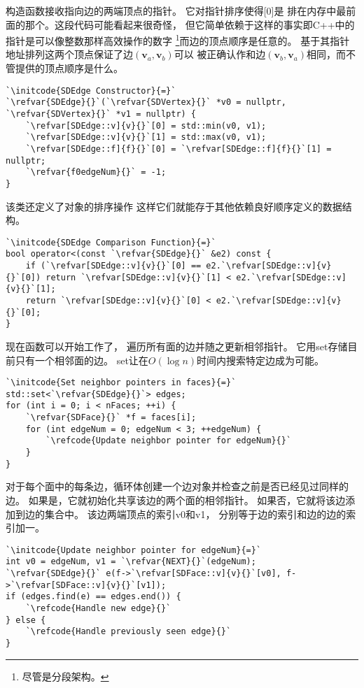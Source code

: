 构造函数接收指向边的两端顶点的指针。
它对指针排序使得{\ttfamily{}[0]}是
排在内存中最前面的那个。这段代码可能看起来很奇怪，
但它简单依赖于这样的事实即C++中的指针是可以像整数那样高效操作的数字
\footnote{尽管是分段架构。}而边的顶点顺序是任意的。
基于其指针地址排列这两个顶点保证了边$(\bm v_a,\bm v_b)$可以
被正确认作和边$(\bm v_b,\bm v_a)$相同，而不管提供的顶点顺序是什么。
\begin{lstlisting}
`\initcode{SDEdge Constructor}{=}`
`\refvar{SDEdge}{}`(`\refvar{SDVertex}{}` *v0 = nullptr, `\refvar{SDVertex}{}` *v1 = nullptr) {
    `\refvar[SDEdge::v]{v}{}`[0] = std::min(v0, v1);
    `\refvar[SDEdge::v]{v}{}`[1] = std::max(v0, v1);
    `\refvar[SDEdge::f]{f}{}`[0] = `\refvar[SDEdge::f]{f}{}`[1] = nullptr;
    `\refvar{f0edgeNum}{}` = -1;
}
\end{lstlisting}

该类还定义了对象的排序操作
这样它们就能存于其他依赖良好顺序定义的数据结构。
\begin{lstlisting}
`\initcode{SDEdge Comparison Function}{=}`
bool operator<(const `\refvar{SDEdge}{}` &e2) const {
    if (`\refvar[SDEdge::v]{v}{}`[0] == e2.`\refvar[SDEdge::v]{v}{}`[0]) return `\refvar[SDEdge::v]{v}{}`[1] < e2.`\refvar[SDEdge::v]{v}{}`[1];
    return `\refvar[SDEdge::v]{v}{}`[0] < e2.`\refvar[SDEdge::v]{v}{}`[0];
}
\end{lstlisting}

现在函数可以开始工作了，
遍历所有面的边并随之更新相邻指针。
它用{\ttfamily set}存储目前只有一个相邻面的边。
{\ttfamily set}让在$O(\log{n})$时间内搜索特定边成为可能。
\begin{lstlisting}
`\initcode{Set neighbor pointers in faces}{=}`
std::set<`\refvar{SDEdge}{}`> edges;
for (int i = 0; i < nFaces; ++i) {
    `\refvar{SDFace}{}` *f = faces[i];
    for (int edgeNum = 0; edgeNum < 3; ++edgeNum) {
        `\refcode{Update neighbor pointer for edgeNum}{}`
    }
}
\end{lstlisting}

对于每个面中的每条边，循环体创建一个边对象并检查之前是否已经见过同样的边。
如果是，它就初始化共享该边的两个面的相邻指针。
如果否，它就将该边添加到边的集合中。
该边两端顶点的索引{\ttfamily v0}和{\ttfamily v1}，
分别等于边的索引和边的边的索引加一。
\begin{lstlisting}
`\initcode{Update neighbor pointer for edgeNum}{=}`
int v0 = edgeNum, v1 = `\refvar{NEXT}{}`(edgeNum);
`\refvar{SDEdge}{}` e(f->`\refvar[SDFace::v]{v}{}`[v0], f->`\refvar[SDFace::v]{v}{}`[v1]);
if (edges.find(e) == edges.end()) {
    `\refcode{Handle new edge}{}`
} else {
    `\refcode{Handle previously seen edge}{}`
}
\end{lstlisting}

